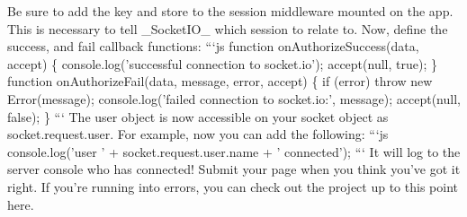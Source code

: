 \documentclass{article}%
\begin{document}
Be sure to add the key and store to the session middleware mounted on the app. This is necessary to tell \_SocketIO\_ which session to relate to.\newline%
Now, define the success, and fail callback functions:\newline%
```js\newline%
function onAuthorizeSuccess(data, accept) \{\newline%
  console.log('successful connection to socket.io');\newline%
  accept(null, true);\newline%
\}\newline%
function onAuthorizeFail(data, message, error, accept) \{\newline%
  if (error) throw new Error(message);\newline%
  console.log('failed connection to socket.io:', message);\newline%
  accept(null, false);\newline%
\}\newline%
```\newline%
The user object is now accessible on your socket object as socket.request.user. For example, now you can add the following:\newline%
```js\newline%
console.log('user ' + socket.request.user.name + ' connected');\newline%
```\newline%
It will log to the server console who has connected!\newline%
Submit your page when you think you've got it right. If you're running into errors, you can check out the project up to this point here.\newline%

%
\end{document}
